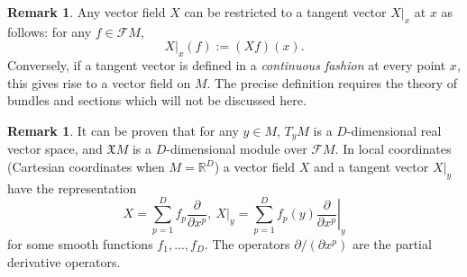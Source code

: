 \documentclass{elsarticle}
\theoremstyle{definition}
\newtheorem{remark}[theorem]{Remark}
\newcommand{\R}{\mathbb{R}}
\newcommand{\restrict}[2]{\left.#1\right|_{#2}}
\begin{document}
\begin{remark}
  Any vector field $X$ can be restricted to a tangent vector $\restrict{X}{x}$ at $x$ as follows: for any $f \in \mathcal{F} M$,
  \begin{equation}
    \restrict{X}{x}(f) := (X f)(x).
  \end{equation}
  Conversely, if a tangent vector is defined in a \emph{continuous fashion} at every point $x$, this gives rise to a vector field on $M$. The precise definition requires the theory of bundles and sections which will not be discussed here.
\end{remark}
\begin{remark}
  It can be proven \cite[Corollary 3.3]{lee2012introduction} that for any $y \in M$, $T_y M$ is a $D$-dimensional real vector space,
  and $\mathfrak{X} M$ is a $D$-dimensional module over $\mathcal{F} M$.
  In local coordinates (Cartesian coordinates when $M = \R^D$) a vector field $X$ and a tangent vector $\restrict{X}{y}$ have the representation
  \begin{equation}
    X = \sum_{p = 1}^D f_p \frac{\partial}{\partial x^p},\
    \restrict{X}{y} = \sum_{p = 1}^D f_p(y) \restrict{\frac{\partial}{\partial x^p}}{y}
  \end{equation}
  for some smooth functions $f_1, ..., f_D$. The operators $\partial / (\partial x^p)$ are the partial derivative operators.
\end{remark}
\end{document}
